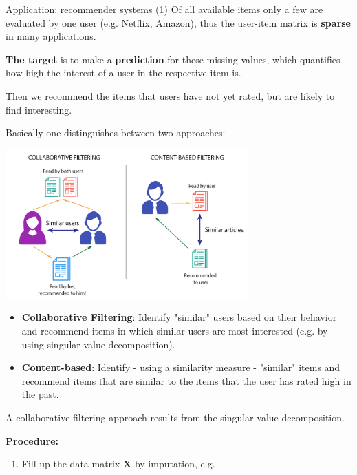 \documentclass[11pt,compress,t,notes=noshow, xcolor=table]{beamer}
\begin{document}
\begin{vbframe}{Application: recommender systems (1)}
Of all available items only a few are evaluated by one user (e.g. Netflix, Amazon), thus the user-item matrix is \textbf{sparse} in many applications.

\lz

\textbf{The target} is to make a \textbf{prediction} for these missing values, which quantifies how high the interest of a user in the respective item is.

\lz

Then we recommend the items that users have not yet rated, but are likely to find interesting.

\framebreak

Basically one distinguishes between two approaches:

\begin{center}
	\includegraphics[width = 0.7\textwidth]{figure_man/ignore/recommender.png}
\end{center}

\framebreak

\begin{itemize}
\item \textbf{Collaborative Filtering}: Identify "similar" users based on their behavior and recommend items in which similar users are most interested (e.g. by using singular value decomposition).
\item \textbf{Content-based}: Identify - using a similarity measure - "similar" items and recommend items that are similar to the items that the user has rated high in the past.
\end{itemize}

\framebreak

A collaborative filtering approach results from the singular value decomposition.

\textbf{Procedure:}

\begin{enumerate}
\item Fill up the data matrix $\mathbf{X}$ by imputation, e.g.


\end{enumerate}
\end{vbframe}
\end{document}
